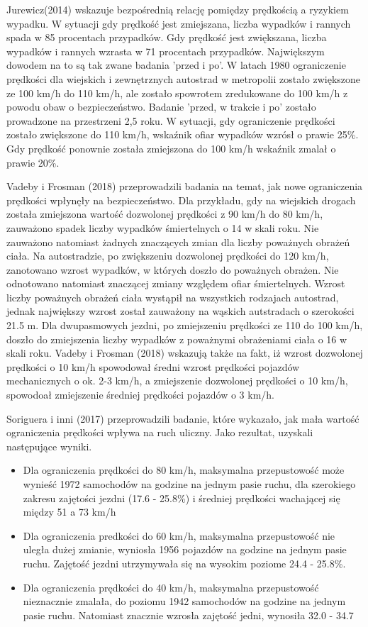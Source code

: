 Jurewicz(2014) wskazuje bezpośrednią relację pomiędzy prędkością a ryzykiem wypadku. W sytuacji gdy prędkość jest zmiejszana,  liczba wypadków i rannych spada w 85 procentach przypadków. Gdy prędkość jest zwiększana, liczba wypadków i rannych wzrasta w 71 procentach przypadków. Największym dowodem na to są tak zwane badania 'przed i po'. W latach 1980 ograniczenie prędkości dla wiejskich i zewnętrznych autostrad w metropolii zostało zwiększone ze 100 km/h do 110 km/h, ale zostało spowrotem zredukowane do 100 km/h z powodu obaw o bezpieczeństwo. Badanie 'przed, w trakcie i po' zostało prowadzone na przestrzeni 2,5 roku. W sytuacji, gdy ograniczenie prędkości zostało zwiększone do 110 km/h, wskaźnik ofiar wypadków wzrósł o prawie 25\%. Gdy prędkość ponownie została zmiejszona do 100 km/h wskaźnik zmalał o prawie 20\%.

Vadeby i Frosman (2018) przeprowadzili badania na temat, jak nowe ograniczenia prędkości wpłynęły na bezpieczeństwo. Dla przykładu, gdy na wiejskich drogach została zmiejszona wartość dozwolonej prędkości z 90 km/h do 80 km/h, zauważono spadek liczby wypadków śmiertelnych o 14 w skali roku. Nie zauważono natomiast żadnych znaczących zmian dla liczby poważnych obrażeń ciała. Na autostradzie, po zwiększeniu dozwolonej prędkości do 120 km/h, zanotowano wzrost wypadków, w których doszło do poważnych obrażen. Nie odnotowano natomiast znaczącej zmiany względem ofiar śmiertelnych. Wzrost liczby poważnych obrażeń ciała wystąpił na wszystkich rodzajach autostrad, jednak największy wzrost został zauważony na wąskich autstradach o szerokości 21.5 m. Dla dwupasmowych jezdni, po zmiejszeniu prędkości ze 110 do 100 km/h, doszło do zmiejszenia liczby wypadków z poważnymi obrażeniami ciała o 16 w skali roku. Vadeby i Frosman (2018) wskazują także na fakt, iż wzrost dozwolonej prędkości o 10 km/h spowodował średni wzrost prędkości pojazdów mechanicznych o ok. 2-3 km/h, a zmiejszenie dozwolonej prędkości o 10 km/h, spowodoał zmiejszenie średniej prędkości pojazdów o 3 km/h. 

Soriguera i inni (2017) przeprowadzili badanie, które wykazało, jak mała wartość ograniczenia prędkości wpływa na ruch uliczny. Jako rezultat, uzyskali następujące wyniki.

\begin{itemize}
\item Dla ograniczenia prędkości do 80 km/h, maksymalna przepustowość może wynieść 1972 samochodów na godzine na jednym pasie ruchu, dla szerokiego zakresu zajętości jezdni (17.6 - 25.8\%) i średniej prędkości wachającej się między 51 a 73 km/h     
\item Dla ograniczenia predkości do 60 km/h, maksymalna przepustowość nie uległa dużej zmianie, wyniosła 1956 pojazdów na godzine na jednym pasie ruchu. Zajętość jezdni utrzymywała się na wysokim poziome 24.4 - 25.8\%. 
\item Dla ograniczenia prędkości do 40 km/h, maksymalna przepustowość nieznacznie zmalała, do poziomu 1942 samochodów na godzine na jednym pasie ruchu. Natomiast znacznie wzrosła zajętość jedni, wynosiła 32.0 - 34.7%
\end{itemize}

